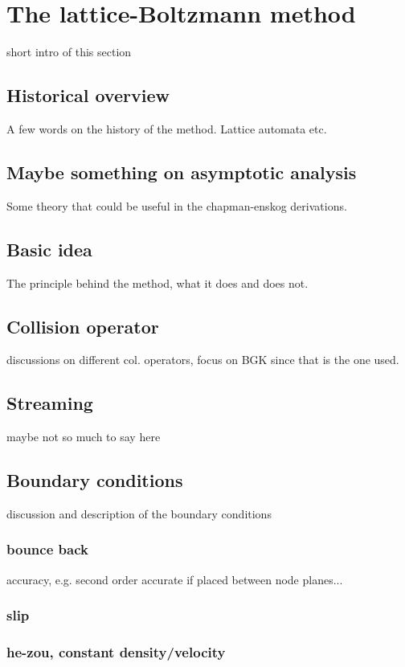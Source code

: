 \chapter{The lattice-Boltzmann method}
short intro of this section

\section{Historical overview}
A few words on the history of the method. Lattice automata etc.

\section{Maybe something on asymptotic analysis}
Some theory that could be useful in the chapman-enskog derivations.

\section{Basic idea}
The principle behind the method, what it does and does not.

\section{Collision operator}
discussions on different col. operators, focus on BGK since that is
the one used.

\section{Streaming}
maybe not so much to say here

\section{Boundary conditions}
discussion and description of the boundary conditions
\subsection{bounce back}
accuracy, e.g. second order accurate if placed between node planes...
\subsection{slip}
\subsection{he-zou, constant density/velocity}
